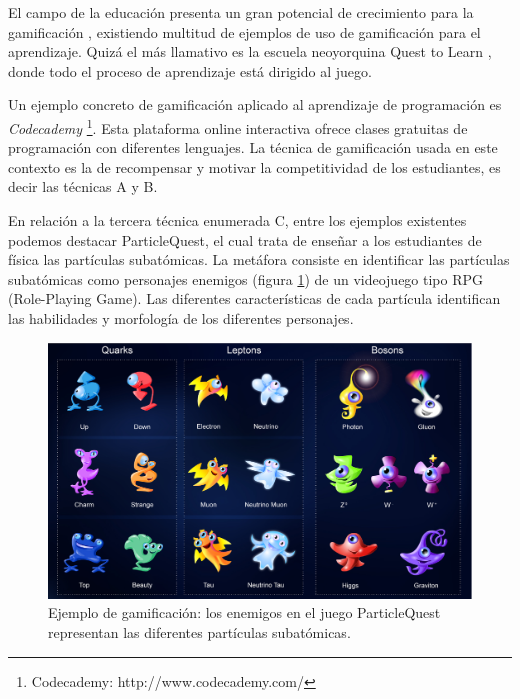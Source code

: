 \documentclass{llncs}
\begin{document}
El campo de la educación presenta un gran potencial de crecimiento para la gamificación \cite{lee2011gamification}, existiendo multitud de ejemplos de uso de gamificación para el aprendizaje. Quizá el más llamativo es la escuela neoyorquina Quest to Learn \cite{salen2011quest}, donde todo el proceso de aprendizaje está dirigido al juego. 

Un ejemplo concreto de gamificación aplicado al aprendizaje de programación es \emph{Codecademy} \footnote{Codecademy: http://www.codecademy.com/}. Esta plataforma online interactiva ofrece clases gratuitas de programación con diferentes lenguajes. La técnica de gamificación usada en este contexto es la de recompensar y motivar la competitividad de los estudiantes, es decir las técnicas A y B. 


En relación a la tercera técnica enumerada C, entre los ejemplos existentes podemos destacar ParticleQuest, el cual trata de enseñar a los estudiantes de física las partículas subatómicas. La metáfora consiste en identificar las partículas subatómicas como personajes enemigos (figura \ref{fig:particlequest}) de un videojuego tipo RPG (Role-Playing Game). Las diferentes características de cada partícula identifican las habilidades y morfología de los diferentes personajes. 

\begin{figure}[ht]
\begin{center}
\includegraphics[scale=0.3]{images/particlequest.eps}
\caption{Ejemplo de gamificación: los enemigos en el juego ParticleQuest representan las diferentes partículas subatómicas.
\label{fig:particlequest}}
\end{center}
\end{figure}
\end{document}
